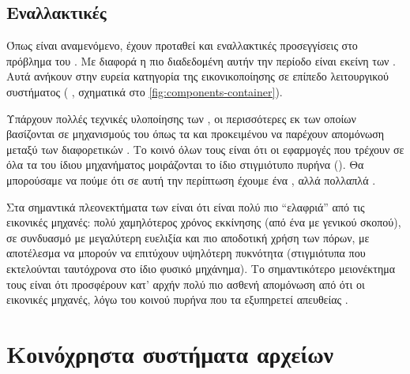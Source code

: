 
\subsection{Εναλλακτικές}

Όπως είναι αναμενόμενο, έχουν προταθεί και εναλλακτικές προσεγγίσεις στο
πρόβλημα του . Με διαφορά η πιο
διαδεδομένη αυτήν την περίοδο είναι εκείνη των . Αυτά ανήκουν
στην ευρεία κατηγορία της εικονικοποίησης σε επίπεδο λειτουργικού συστήματος
( \cite{wiki:os-level-virtualization}, σχηματικά στο
\ref{fig:components-container}).

Υπάρχουν πολλές τεχνικές υλοποίησης των , οι περισσότερες εκ των
οποίων βασίζονται σε μηχανισμούς του \linux{}  όπως τα 
και  προκειμένου να παρέχουν απομόνωση μεταξύ των διαφορετικών
. Το κοινό όλων τους είναι ότι οι εφαρμογές που τρέχουν σε όλα
τα  του ίδιου μηχανήματος μοιράζονται το ίδιο στιγμιότυπο πυρήνα
(). Θα μπορούσαμε να πούμε ότι σε αυτή την περίπτωση έχουμε ένα
, αλλά πολλαπλά .

Στα σημαντικά πλεονεκτήματα των  είναι ότι είναι πολύ πιο
``ελαφριά'' από τις εικονικές μηχανές: πολύ χαμηλότερος χρόνος εκκίνησης (από
ένα  με \guest{} γενικού σκοπού), σε συνδυασμό με μεγαλύτερη
ευελιξία και πιο αποδοτική χρήση των πόρων, με αποτέλεσμα να μπορούν να
επιτύχουν υψηλότερη πυκνότητα (στιγμιότυπα που εκτελούνται ταυτόχρονα στο ίδιο
φυσικό μηχάνημα). Το σημαντικότερο μειονέκτημα τους είναι ότι προσφέρουν κατ'
αρχήν πολύ πιο ασθενή απομόνωση από ότι οι εικονικές μηχανές, λόγω του κοινού
πυρήνα που τα εξυπηρετεί απευθείας \cite{lightvm}.



\section{Κοινόχρηστα συστήματα αρχείων}


